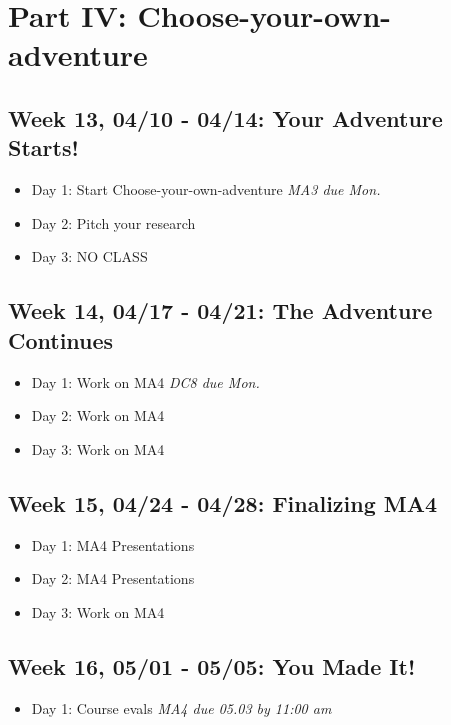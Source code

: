 \documentclass[11pt,]{article}
\providecommand{\tightlist}{%
  \setlength{\itemsep}{0pt}\setlength{\parskip}{0pt}}
\begin{document}
\hypertarget{part-iv-choose-your-own-adventure}{%
\section{Part IV:
Choose-your-own-adventure}\label{part-iv-choose-your-own-adventure}}

\hypertarget{week-13-0410---0414-your-adventure-starts}{%
\subsection{Week 13, 04/10 - 04/14: Your Adventure
Starts!}\label{week-13-0410---0414-your-adventure-starts}}

\begin{itemize}
\item
  Day 1: Start Choose-your-own-adventure \hfill \textit{MA3 due Mon.}
\item
  Day 2: Pitch your research
\item
  Day 3: NO CLASS
\end{itemize}

\hypertarget{week-14-0417---0421-the-adventure-continues}{%
\subsection{Week 14, 04/17 - 04/21: The Adventure
Continues}\label{week-14-0417---0421-the-adventure-continues}}

\begin{itemize}
\item
  Day 1: Work on MA4 \hfill \textit{DC8 due Mon.}
\item
  Day 2: Work on MA4
\item
  Day 3: Work on MA4
\end{itemize}

\hypertarget{week-15-0424---0428-finalizing-ma4}{%
\subsection{Week 15, 04/24 - 04/28: Finalizing
MA4}\label{week-15-0424---0428-finalizing-ma4}}

\begin{itemize}
\item
  Day 1: MA4 Presentations
\item
  Day 2: MA4 Presentations
\item
  Day 3: Work on MA4
\end{itemize}

\hypertarget{week-16-0501---0505-you-made-it}{%
\subsection{Week 16, 05/01 - 05/05: You Made
It!}\label{week-16-0501---0505-you-made-it}}

\begin{itemize}
\tightlist
\item
  Day 1: Course evals \hfill \textit{MA4 due 05.03 by 11:00 am}
\end{itemize}
\end{document}
